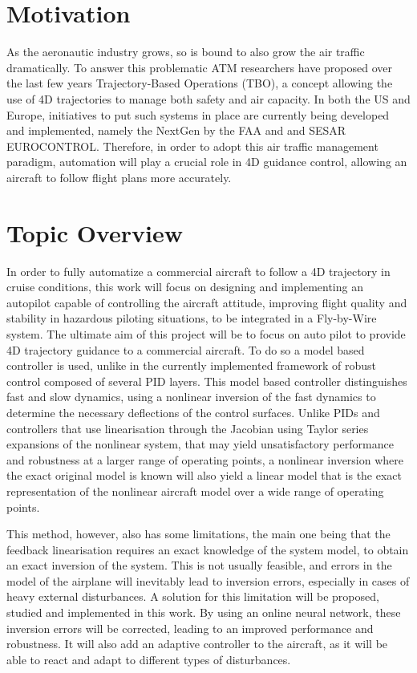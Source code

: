\section{Motivation}
\label{section:motivation}

As the aeronautic industry grows, so is bound to also grow the air traffic dramatically. To answer this problematic ATM researchers have proposed over the last few years Trajectory-Based Operations (TBO), a concept allowing the use of 4D trajectories to manage both safety and air capacity. In both the US and Europe, initiatives to put such systems in place are currently being developed and implemented, namely the NextGen by the FAA and and SESAR EUROCONTROL. Therefore, in order to adopt this air traffic management paradigm, automation will play a crucial role in 4D guidance control, allowing an aircraft to follow flight plans more accurately.

\section{Topic Overview}
\label{section:overview}

In order to fully automatize a commercial aircraft to follow a 4D trajectory in cruise conditions, this work will focus on designing and implementing an autopilot capable of controlling the aircraft attitude, improving flight quality and stability in hazardous piloting situations, to be integrated in a Fly-by-Wire system. The ultimate aim of this project will be to focus on auto pilot to provide 4D trajectory guidance to a commercial aircraft. To do so a model based controller is used, unlike in the currently implemented framework of robust control composed of several PID layers. This model based controller distinguishes fast and slow dynamics, using a nonlinear inversion of the fast dynamics to determine the necessary deflections of the control surfaces. Unlike PIDs and controllers that use linearisation through the Jacobian using Taylor series expansions of the nonlinear system, that may yield unsatisfactory performance and robustness at a larger range of operating points, a nonlinear inversion where the exact original model is known will also yield a linear model that is the exact representation of the nonlinear aircraft model over a wide range of operating points. 

This method, however, also has some limitations, the main one being that the feedback linearisation requires an exact knowledge of the system model, to obtain an exact inversion of the system. This is not usually feasible, and errors in the model of the airplane will inevitably lead to inversion errors, especially in cases of heavy external disturbances. A solution for this limitation will be proposed, studied and implemented in this work. By using an online neural network, these inversion errors will be corrected, leading to an improved performance and robustness. It will also add an adaptive controller to the aircraft, as it will be able to react and adapt to different types of disturbances.

